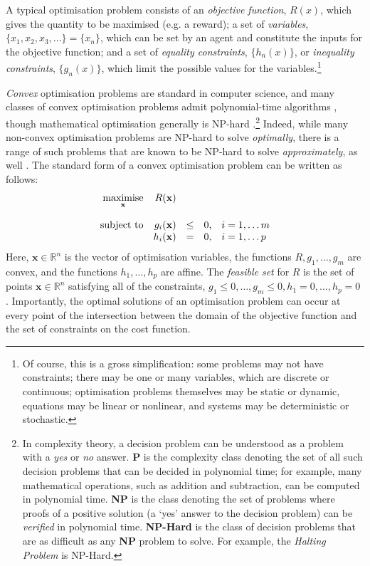 \documentclass{amsart}
\theoremstyle{indented}
\theoremstyle{indentedProp}
\theoremstyle{indented}
\theoremstyle{indented}
\theoremstyle{indented}
\theoremstyle{indented}
\theoremstyle{indented}
\begin{document}
A typical optimisation problem consists of an {\it objective function}, $R(x)$, which gives the quantity to be maximised (e.g. a reward); a set of {\it variables}, $\{ x_1, x_2, x_3, \ldots\} = \{ x_n \}$, which can be set by an agent and constitute the inputs for the objective function; and a set of {\it equality constraints}, $\{ h_n(x) \}$, or {\it inequality constraints}, $\{ g_n(x)\}$, which limit the possible values for the variables.\footnote{Of course, this is a gross simplification: some problems may not have constraints; there may be one or many variables, which are discrete or continuous; optimisation problems themselves may be static or dynamic, equations may be linear or nonlinear, and systems may be deterministic or stochastic.} 

{\it Convex} optimisation problems are standard in computer science, and many classes of convex optimisation problems admit polynomial-time algorithms \citep{Nesterov-Nemirovskii-1994}, though mathematical optimisation generally is NP-hard \citep{Sahni-1974, Murty-Kabadi-1987, Pardalos-Vavasis-1991}.\footnote{In complexity theory, a decision problem can be understood as a problem with a {\it yes} or {\it no} answer. {\bf P} is the complexity class denoting the set of all such decision problems that can be decided in polynomial time; for example, many mathematical operations, such as addition and subtraction, can be computed in polynomial time. {\bf NP} is the class denoting the set of problems where proofs of a positive solution (a `yes' answer to the decision problem) can be {\it verified} in polynomial time. {\bf NP-Hard} is the class of decision problems that are as difficult as any {\bf NP} problem to solve. For example, the {\it Halting Problem} is NP-Hard.} Indeed, while many non-convex  optimisation problems are NP-hard to solve {\it optimally}, there is a range of such problems that are known to be NP-hard to solve {\it approximately}, as well \citep{Meka-et-al-2008}. The standard form of a convex optimisation problem can be written as follows:
\begin{equation}\label{eq:ConvOpt}
    \begin{array}{rrcll}
        \underset{\mathbf{x}}{\mathrm{maximise}} & R({\mathbf x}) & & & \\
        & & & & \\
        \rm{subject\ to} & g_{i}({\mathbf x}) & \leq & 0, & i = 1, \ldots m \\
        & h_{i}({\mathbf x}) & = & 0, & i = 1, \ldots p \\
    \end{array}
\end{equation}
Here, $\mathbf{x} \in \mathbb{R}^{n}$ is the vector of optimisation variables, the functions $R, g_1 , \ldots , g_m$ are convex, and the functions $h_1, \ldots, h_p$ are affine. The {\it feasible set} for $R$ is the set of points $\mathbf{x} \in \mathbb{R}^{n}$ satisfying all of the constraints, $g_1 \leq 0, \ldots , g_m \leq 0, h_1 = 0, \ldots , h_p = 0$ \citep{Boyd-Vandenberghe-2004}. Importantly, the optimal solutions of an optimisation problem can occur at every point of the intersection between the domain of the objective function and the set of constraints on the cost function. 
\end{document}
